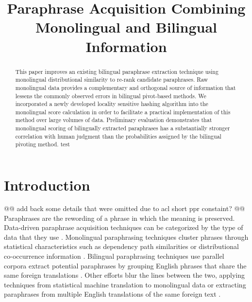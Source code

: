 \documentclass[11pt]{article}
\title{Paraphrase Acquisition Combining Monolingual and Bilingual Information}
\date{}
\begin{document}
\maketitle
\begin{abstract}
This paper improves an existing bilingual paraphrase extraction technique using monolingual distributional similarity to re-rank candidate paraphrases.  Raw monolingual data  provides a complementary and orthogonal source of information that lessens the commonly observed errors in bilingual pivot-based methods. We incorporated a newly developed locality sensitive hashing algorithm into the monolingual score calculation in order to facilitate a practical implementation of this method over large volumes of data. Preliminary evaluation demonstrates that monolingual scoring of bilingually extracted paraphrases has a substantially stronger correlation with human judgment than the probabilities assigned by the bilingual pivoting method. test


\end{abstract} 


\section{Introduction}
@@ add back some details that were omitted due to acl short ppr constaint? @@
Paraphrases are the rewording of a phrase in which the meaning is preserved. Data-driven paraphrase acquisition techniques can be categorized by the type of data that they use \cite{MadnaniDorr10}.  Monolingual paraphrasing techniques cluster phrases through statistical characteristics such as dependency path similarities or distributional co-occurrence information \cite{Lin01discoveryof,PascaDienes05}.   Bilingual paraphrasing techniques use parallel corpora extract potential paraphrases by grouping English phrases that share the same foreign translations \cite{BannardCallisonBurch05}.  Other efforts blur the lines between the two, applying techniques from statistical machine translation to monolingual data or extracting paraphrases from multiple English translations of the same foreign text \cite{Barzilay2001,PangEtAl03,QuirkDolanBrockett04}.

\end{document}
